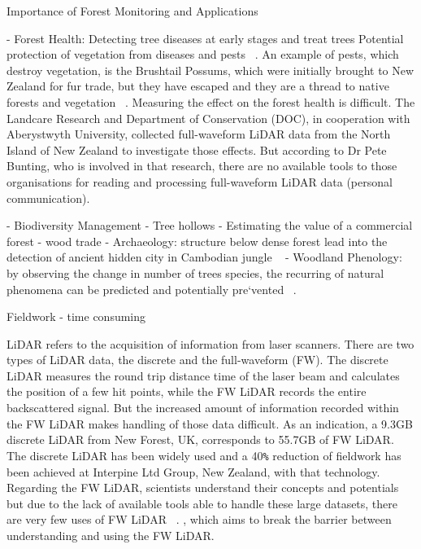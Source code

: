 \documentclass{subfiles}
\begin{document}
Importance of Forest Monitoring and Applications

 - Forest Health: Detecting tree diseases at early stages and treat trees 
 Potential protection of vegetation from diseases and pests ~\cite{ForestryCommision2014}.  
 An example of pests, which destroy vegetation, is the Brushtail Possums, which were initially brought to New Zealand for fur trade, but they have escaped and they are a thread to native forests and vegetation ~\cite{DepartementOfConversation2014}. Measuring the effect on the forest health is difficult. The Landcare Research and Department of Conservation (DOC), in cooperation with Aberystwyth University, collected full-waveform LiDAR data from the North Island of New Zealand to investigate those effects. But according to Dr Pete Bunting, who is involved in that research, there are no available tools to those organisations for reading and processing full-waveform LiDAR data (personal communication). 
 
 - Biodiversity Management - Tree hollows 
 - Estimating the value of a commercial forest - wood trade
 - Archaeology: structure below dense forest lead into the detection of ancient hidden city in Cambodian jungle ~\cite{Lawrie2014}
 - Woodland Phenology: by observing the change in number of trees species, the recurring of natural phenomena can be predicted and potentially pre`vented ~\cite{BBC2009}. 
 
 
 
Fieldwork - time consuming



\par LiDAR refers to the acquisition of information from laser scanners. There are two types of LiDAR data, the discrete and the full-waveform (FW). The discrete LiDAR measures the round trip distance time of the laser beam and calculates the position of a few hit points, while the FW LiDAR records the entire backscattered signal. But the increased amount of information recorded within the FW LiDAR makes handling of those data difficult. As an indication, a 9.3GB discrete LiDAR from New Forest, UK, corresponds to 55.7GB of FW LiDAR. The discrete LiDAR has been widely used and a 40\verb|%| reduction of fieldwork has been achieved at Interpine Ltd Group, New Zealand, with that technology. Regarding the FW LiDAR, scientists understand their concepts and potentials but due to the lack of available tools able to handle these large datasets, there are very few uses of FW LiDAR ~\cite{Anderson2015}.
, which aims to break the barrier between understanding and using the FW LiDAR.
\end{document}
